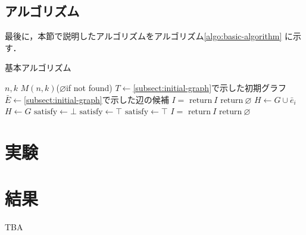 \subsection{アルゴリズム}
\label{subsect:basic-algorithm}
最後に，本節で説明したアルゴリズムをアルゴリズム\ref{algo:basic-algorithm}
に示す．
\begin{algorithm}
  \caption{基本アルゴリズム}
  \label{algo:basic-algorithm}
  \begin{algorithmic}[1]
    \Require $n,k$
    \Ensure $M(n,k)$($\varnothing$if not found)
    \State $T\gets$\ref{subsect:initial-graph}で示した初期グラフ
    \State $\bar{E}\gets$\ref{subsect:initial-graph}で示した辺の候補
    \State $I=$
    \State $\mathrm{return}\:I$
    \EndIf
    \EndFor
    \State $\mathrm{return}\:\varnothing$
    \EndProcedure
    \State $H\gets G\cup\bar{e}_i$
    \Else
    \State $H\gets G$
    \EndIf
    \State $\mathrm{satisfy}\gets\bot$
    \State $\mathrm{satisfy}\gets\top$
    \EndIf
    \State $\mathrm{satisfy}\gets\top$
    \EndIf
    \State $I=$
    \State $\mathrm{return}\:I$
    \EndIf
    \EndFor
    \Else
    \State $\mathrm{return}\:\varnothing$
    \EndIf
    \EndProcedure
  \end{algorithmic}
\end{algorithm}

\section{実験}
\label{sect:exp-basic-algorithm}

\section{結果}
\label{sect:result-basic-algorithm}
TBA
